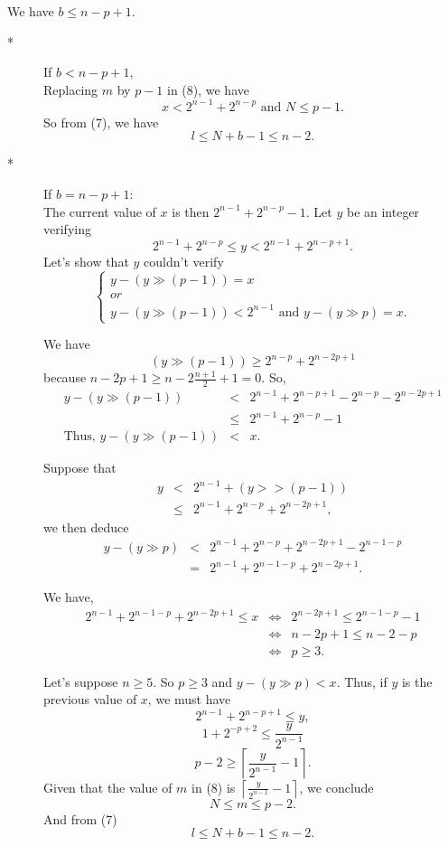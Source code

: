 \documentclass[a4paper,12pt]{article}
\begin{document}
We have $b \le n-p+1$.
\begin{description}
\item[*] If $b < n-p+1$,\\
Replacing $m$ by $p-1$ in (8), we have
\[x < 2^{n-1} + 2^{n-p} \mbox{ and } N \le p-1.\]
So from (7), we have
\[l \le N + b - 1 \le n-2.\]
\item[*]If $b = n-p+1$:\\
The current value of $x$ is then $2^{n-1} + 2^{n-p} - 1$.
Let $y$ be an integer verifying
\[2^{n-1} + 2^{n-p} \le y < 2^{n-1} + 2^{n-p+1}.\]
Let's show that $y$ couldn't verify
\[\left\{\begin{array}{l}
y - (y \gg (p-1)) = x\\
or\\
y - (y \gg (p-1)) < 2^{n-1} \mbox{ and } y - (y \gg p) = x.
\end{array}\right. \]

We have
\[(y \gg (p-1)) \ge 2^{n-p} + 2^{n-2p+1}\] because
$n-2p+1 \ge n - 2\frac{n+1}{2}+1 = 0$.  So,
\begin{eqnarray*}
y - (y \gg (p-1)) &<& 2^{n-1} + 2^{n-p+1} - 2^{n-p} - 2^{n-2p+1}\\
&\le& 2^{n-1} + 2^{n-p} - 1\\
\mbox{Thus, }y - (y \gg (p-1)) &<& x.
\end{eqnarray*}

Suppose that
\begin{eqnarray*}
y &<& 2^{n-1} + (y >> (p-1))\\
&\le& 2^{n-1} + 2^{n-p} + 2^{n-2p+1},
\end{eqnarray*}
we then deduce
\begin{eqnarray*}
y - (y \gg p) &<& 2^{n-1} + 2^{n-p} + 2^{n-2p+1} - 2^{n-1-p}\\
&=& 2^{n-1} + 2^{n-1-p} + 2^{n-2p+1}.
\end{eqnarray*}

We have,
\begin{eqnarray*}
2^{n-1} + 2^{n-1-p} + 2^{n-2p+1} \le x & \Leftrightarrow &
2^{n-2p+1} \le 2^{n-1-p} - 1\\ & \Leftrightarrow &
n-2p+1 \le n-2-p\\ & \Leftrightarrow &
p \ge 3.
\end{eqnarray*}

Let's suppose $n \ge 5$.  So $p \ge 3$ and $y - (y \gg p) < x$.  Thus, if $y$
is the previous value of $x$, we must have
\[ 2^{n-1} + 2^{n-p+1} \le y,\]
\[ 1 + 2^{-p+2} \le \frac{y}{2^{n-1}}\]
\[ p-2 \ge \left\lceil \frac{y}{2^{n-1}} - 1 \right\rceil.\]
Given that the value of $m$ in (8) is $\left\lceil \frac{y}{2^{n-1}} - 1 
\right\rceil$, we conclude 
\[ N \le m \le p-2.\]
And from (7)
\[l \le N + b - 1 \le n-2.\] 
\end{description}
\end{document}

